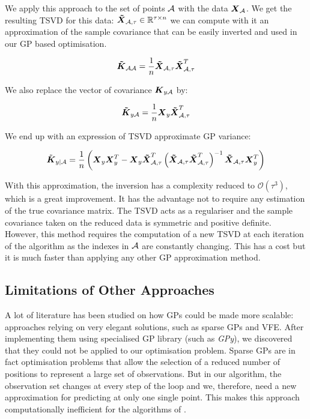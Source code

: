 We apply this approach to the set of points $\mathcal{A}$ with the data ${\boldsymbol{{X}}}_{\mathcal{A}}$. We get the resulting TSVD for this data: ${\boldsymbol{{\tilde{X}}}}_{\mathcal{A},\tau} \in \mathbb{R}^{\tau \times n}$ we can compute with it an approximation of the sample covariance that can be easily inverted and used in our GP based optimisation.

\begin{equation}
    {\boldsymbol{{\tilde{K}}}}_{\mathcal{A}\mathcal{A}} = \frac{1}{n}{\boldsymbol{{\tilde{X}}}}_{\mathcal{A},\tau}  {\boldsymbol{{\tilde{X}}}}_{\mathcal{A},\tau}^T
\end{equation}


We also replace the vector of covariance ${\boldsymbol{{K}}}_{y\mathcal{A}}$ by: 

\begin{equation}
    {\boldsymbol{{\tilde{K}}}}_{y\mathcal{A}} =  \frac{1}{n}{\boldsymbol{{X}}}_{y} {\boldsymbol{{\tilde{X}}}}_{\mathcal{A},\tau}^T
\end{equation}

We end up with an expression of TSVD approximate GP variance: 

\begin{equation}
    \tilde{{\boldsymbol{{K}}}}_{y | \mathcal{A}} =  \frac{1}{n} \left( {\boldsymbol{{X}}}_{y}{\boldsymbol{{X}}}_{y}^T - {\boldsymbol{{X}}}_{y} {\boldsymbol{{\tilde{X}}}}_{\mathcal{A},\tau}^T \left({\boldsymbol{{\tilde{X}}}}_{\mathcal{A},\tau}  {\boldsymbol{{\tilde{X}}}}_{\mathcal{A},\tau}^T \right)^{-1}  {\boldsymbol{{\tilde{X}}}}_{\mathcal{A},\tau} {\boldsymbol{{X}}}_{y}^T \right)
\end{equation}

With this approximation, the inversion has a complexity reduced to $\mathcal{O}(\tau^3)$, which is a great improvement. It has the advantage not to require any estimation of the true covariance matrix. The TSVD acts as a regulariser and the sample covariance taken on the reduced data is symmetric and positive definite. \\

 However, this method requires the computation of a new TSVD at each iteration of the algorithm as the indexes in $\mathcal{A}$ are constantly changing. This has a cost but it is much faster than applying any other GP approximation method. 
 

\subsection{Limitations of Other Approaches}

A lot of literature has been studied on how GPs could be made more scalable: approaches relying on very elegant solutions, such as sparse GPs and VFE. After implementing them using specialised GP library (such as \textit{GPy}), we discovered that they could not be applied to our optimisation problem. Sparse GPs are in fact optimisation problems that allow the selection of a reduced number of positions to represent a large set of observations. But in our algorithm, the observation set changes at every step of the loop and we, therefore, need a new approximation for predicting at only one single point. This makes this approach computationally inefficient for the algorithms of \citet{krause_near-optimal_2008}. \\

